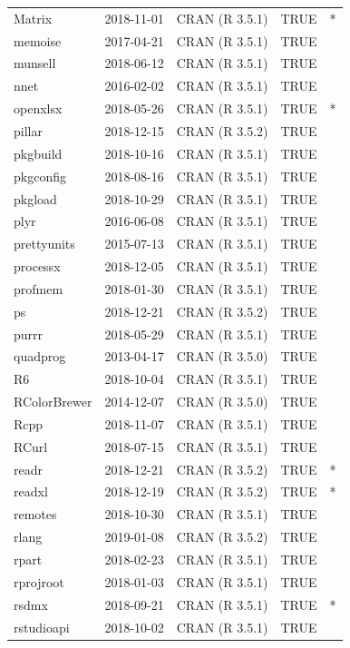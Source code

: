 \documentclass{grattan}\usepackage[]{graphicx}\usepackage[]{color}
\begin{document}
\begin{longtable}{lllll}
  Matrix & 2018-11-01 & CRAN (R 3.5.1) & TRUE & * \\ 
  memoise & 2017-04-21 & CRAN (R 3.5.1) & TRUE &  \\ 
  munsell & 2018-06-12 & CRAN (R 3.5.1) & TRUE &  \\ 
  nnet & 2016-02-02 & CRAN (R 3.5.1) & TRUE &  \\ 
  openxlsx & 2018-05-26 & CRAN (R 3.5.1) & TRUE & * \\ 
  pillar & 2018-12-15 & CRAN (R 3.5.2) & TRUE &  \\ 
  pkgbuild & 2018-10-16 & CRAN (R 3.5.1) & TRUE &  \\ 
  pkgconfig & 2018-08-16 & CRAN (R 3.5.1) & TRUE &  \\ 
  pkgload & 2018-10-29 & CRAN (R 3.5.1) & TRUE &  \\ 
  plyr & 2016-06-08 & CRAN (R 3.5.1) & TRUE &  \\ 
  prettyunits & 2015-07-13 & CRAN (R 3.5.1) & TRUE &  \\ 
  processx & 2018-12-05 & CRAN (R 3.5.1) & TRUE &  \\ 
  profmem & 2018-01-30 & CRAN (R 3.5.1) & TRUE &  \\ 
  ps & 2018-12-21 & CRAN (R 3.5.2) & TRUE &  \\ 
  purrr & 2018-05-29 & CRAN (R 3.5.1) & TRUE &  \\ 
  quadprog & 2013-04-17 & CRAN (R 3.5.0) & TRUE &  \\ 
  R6 & 2018-10-04 & CRAN (R 3.5.1) & TRUE &  \\ 
  RColorBrewer & 2014-12-07 & CRAN (R 3.5.0) & TRUE &  \\ 
  Rcpp & 2018-11-07 & CRAN (R 3.5.1) & TRUE &  \\ 
  RCurl & 2018-07-15 & CRAN (R 3.5.1) & TRUE &  \\ 
  readr & 2018-12-21 & CRAN (R 3.5.2) & TRUE & * \\ 
  readxl & 2018-12-19 & CRAN (R 3.5.2) & TRUE & * \\ 
  remotes & 2018-10-30 & CRAN (R 3.5.1) & TRUE &  \\ 
  rlang & 2019-01-08 & CRAN (R 3.5.2) & TRUE &  \\ 
  rpart & 2018-02-23 & CRAN (R 3.5.1) & TRUE &  \\ 
  rprojroot & 2018-01-03 & CRAN (R 3.5.1) & TRUE &  \\ 
  rsdmx & 2018-09-21 & CRAN (R 3.5.1) & TRUE & * \\ 
  rstudioapi & 2018-10-02 & CRAN (R 3.5.1) & TRUE &  \\ 

\end{longtable}
\end{document}

